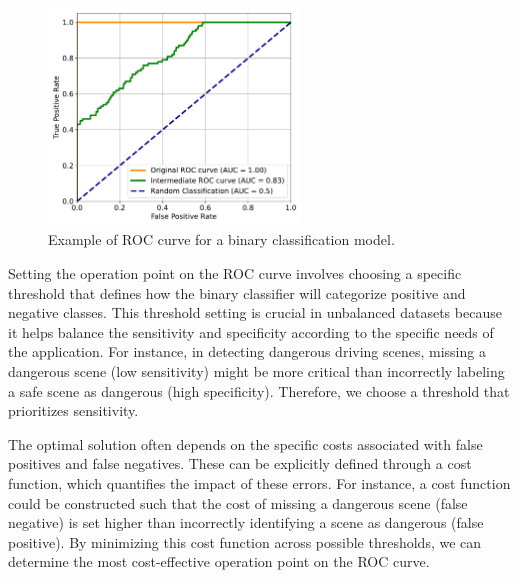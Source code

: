 \begin{figure}
    \centering
    \includegraphics[width=0.6\textwidth]{images/roc/roc_curve.pdf}
    \caption{Example of ROC curve for a binary classification model.}
    \label{fig:roc_curve}
\end{figure}

Setting the operation point on the ROC curve involves choosing a specific 
threshold that defines how the binary classifier will categorize positive and 
negative classes. This threshold setting is crucial in unbalanced datasets 
because it helps balance the sensitivity and specificity according to the 
specific needs of the application. For instance, in detecting dangerous driving 
scenes, missing a dangerous scene (low sensitivity) might be more critical than 
incorrectly labeling a safe scene as dangerous (high specificity). Therefore, 
we choose a threshold that prioritizes sensitivity.

The optimal solution often depends on the specific costs associated with false 
positives and false negatives. These can be explicitly defined through a cost 
function, which quantifies the impact of these errors. For instance, a cost 
function could be constructed such that the cost of missing a dangerous scene 
(false negative) is set higher than incorrectly identifying a scene as dangerous 
(false positive). By minimizing this cost function across possible thresholds, 
we can determine the most cost-effective operation point on the ROC curve.